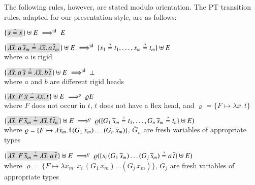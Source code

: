 The following rules, however, are stated modulo orientation. The PT transition
rules, adapted for our presentation style, are as follows:

\begin{description}[labelwidth=\widthof{\rm\unifrulename{\bf Decomposition}}]
    \item[\rm\textsf{Deletion}] 
      $\{\selected{s \unif s}\} \uplus E \ptarrowid E$
    \item[\rm\textsf{Decomposition}]
      $\{\selected{\lambda \overline{x}. \, a \, \overline{s}_m \unif \lambda \overline{x}. \, a \, \overline{t}_m} \} 
        \uplus \allowbreak
        E \ptarrowid \{ s_1 \unif  t_1, \ldots, s_m \unif t_m \} \uplus E$
        \\ where $a$ is rigid
    \item[\rm\textsf{Failure}]
        $\{\selected{\lambda \overline{x}. \, a \, \overline{s} \unif \lambda \overline{x}. \, b \, \overline{t}} \} 
          \uplus \allowbreak
          E \ptarrowid \bot$
    \\ where $a$ and $b$ are different rigid heads
    \item[\rm\textsf{Solution}] 
      $\{\selected{\lambda \overline{x}.\, F\,\overline{x} \unif \lambda \overline{x}.\,t} \} \uplus E \ptarrow{\varrho} \varrho E$
      \\where $F$ does not occur in $t$, $t$ does not have a flex head, and $\varrho = \{ F \mapsto \lambda \overline{x}.\,t \}$ 
    \item[\rm\textsf{Imitation}]
      $\{\selected{\lambda \overline{x}. \, F \, \overline{s}_m \unif \lambda
      \overline{x}. \, \cst{f} \, \overline{t}_n }\} \uplus E \ptarrow{\varrho}
      \varrho(\{ G_1 \,
      \overline{s}_m  \unif  t_1, \ldots,  G_n \, \overline{s}_m \allowbreak \unif t_n\} \uplus E)$ \\
      where $\varrho = \{ F \mapsto \lambda \overline{x}_m. \, \mathsf{f} \, (G_1
      \, \overline{x}_m) \ldots (G_n \, \overline{x}_m) \}$,
      $\overline{G}_n$ are fresh variables of appropriate types
    \item[\rm\textsf{Projection}]
      $\{\selected{\lambda \overline{x}. \, F \, \overline{s}_m \unif \lambda
      \overline{x}. \, a \, \overline{t} }\} \uplus E \ptarrow{\varrho} 
      \varrho(\{ s_i \, (G_1 \,
      \overline{s}_m) \ldots (G_j \, \overline{s}_m) \unif a \, \overline{t}\} \uplus E)$ \\
      where $\varrho =\{F \mapsto \lambda \overline{x}_m. \, x_i \, (G_1 \,
      \overline{x}_m) \ldots (G_j \, \overline{x}_m)\}$, $\overline{G}_j$ are
      fresh variables of appropriate types
\end{description}
